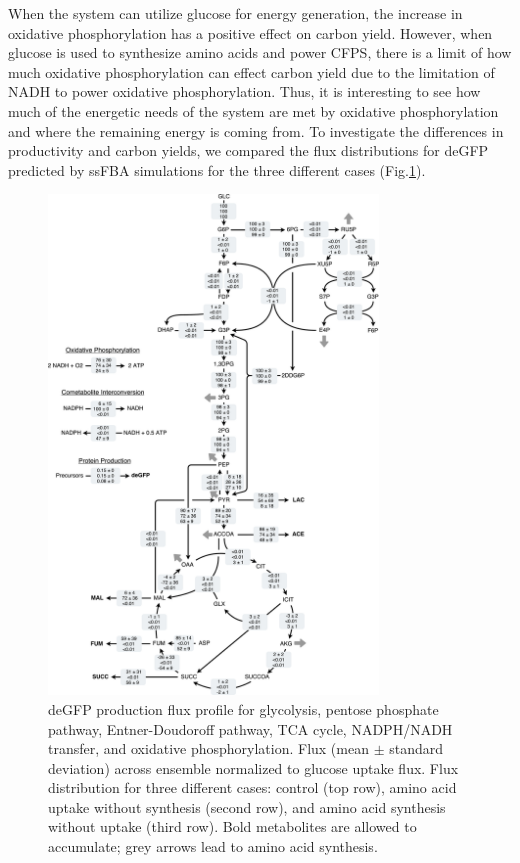 \documentclass[journal=asbcd6,manuscript=article]{achemso}
\begin{document}
When the system can utilize glucose for energy generation, the increase in oxidative phosphorylation has a positive effect on carbon yield.
However, when glucose is used to synthesize amino acids and power CFPS, there is a limit of how much oxidative phosphorylation can effect carbon yield due to the limitation of NADH to power oxidative phosphorylation.
Thus, it is interesting to see how much of the energetic needs of the system are met by oxidative phosphorylation and where the remaining energy is coming from.
To investigate the differences in productivity and carbon yields, we compared the flux distributions for deGFP predicted by ssFBA simulations for the three different cases (Fig.\ref{fig:flux}).
\begin{figure}[t!]
\includegraphics[width=0.78\textwidth]{./Figures/flux.pdf}
\caption{deGFP production flux profile for glycolysis, pentose phosphate pathway, Entner-Doudoroff pathway, TCA cycle, NADPH/NADH transfer, and oxidative phosphorylation. Flux (mean $\pm$ standard deviation) across ensemble normalized to glucose uptake flux. Flux distribution for three different cases: control (top row), amino acid uptake without synthesis (second row), and amino acid synthesis without uptake (third row). Bold metabolites are allowed to accumulate; grey arrows lead to amino acid synthesis.}
\label{fig:flux}
\end{figure}
\end{document}
